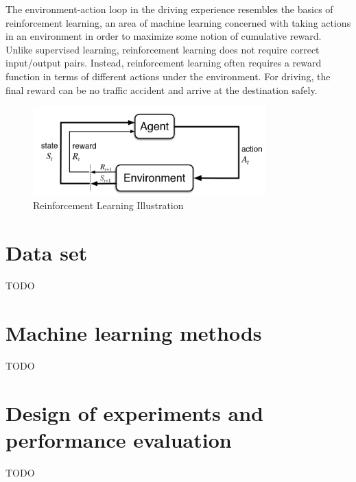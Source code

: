 \documentclass[a4paper]{article}
\begin{document}
The environment-action loop in the driving experience resembles the basics of reinforcement
learning, an area of machine learning concerned with taking actions in an environment in
order to maximize some notion of cumulative reward. Unlike supervised learning, reinforcement
learning does not require correct input/output pairs. Instead, reinforcement learning often
requires a reward function in terms of different actions under the environment. For driving,
the final reward can be no traffic accident and arrive at the destination safely.

\begin{figure}
\centering
\includegraphics[width=0.8\textwidth]{figures/rl.png}
\caption{\label{fig:RL} Reinforcement Learning Illustration}
\end{figure}


\section{Data set}

TODO

\section{Machine learning methods}

TODO

\section{Design of experiments and performance evaluation}

TODO



%
\end{document}
